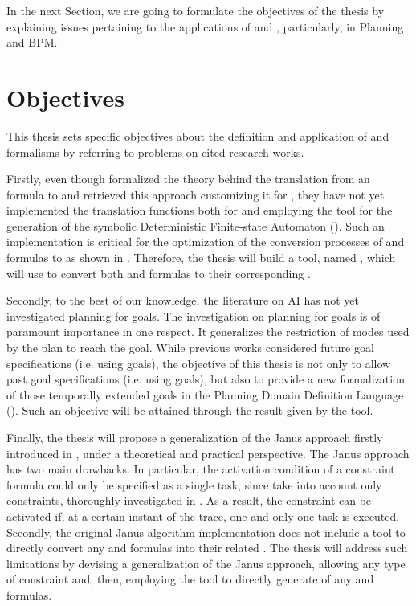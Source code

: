 In the next Section, we are going to formulate the objectives of the thesis by explaining issues pertaining to the applications of \LTLf and \PLTL, particularly, in Planning and BPM.
\section{Objectives}
This thesis sets specific objectives about the definition and application of \LTLf and \PLTL formalisms by referring to problems on cited research works.

Firstly, even though \cite{de2013linear} formalized the theory behind the translation from an \LTLf formula to \FOL and \cite{zpv2018} retrieved this approach customizing it for \MONA, they have not yet implemented the translation functions both for \LTLf and \PLTL employing the \MONA tool for the generation of the symbolic Deterministic Finite-state Automaton (\DFA). Such an implementation is critical for the optimization of the conversion processes of \LTLf and \PLTL formulas to \DFA as shown in \cite{zhu2017symbolic}. Therefore, the thesis will build a tool, named \LTLfToDFA, which will use \MONA to convert both \LTLf and \PLTL formulas to their corresponding \DFA.

Secondly, to the best of our knowledge, the literature on AI has not yet investigated planning for \PLTL goals. The investigation on planning for \PLTL goals is of paramount importance in one respect. It generalizes the restriction of modes used by the plan to reach the goal. While previous works \citep{camacho2017non, camacho2018finite, camacho2018ltl} considered future goal specifications (i.e. using \LTLf goals), the objective of this thesis is not only to allow past goal specifications (i.e. using \PLTL goals), but also to provide a new formalization of those temporally extended goals in the Planning Domain Definition Language (\PDDL). Such an objective will be attained through the result given by the \LTLfToDFA tool.

Finally, the thesis will propose a generalization of the Janus approach firstly introduced in \cite{cecconi2018interestingness}, under a theoretical and practical perspective. The Janus approach has two main drawbacks. In particular, the activation condition of a constraint formula could only be specified as a single task, since \cite{cecconi2018interestingness} take into account only \declare constraints, thoroughly investigated in \cite{pesic2008constraint}. As a result, the constraint can be activated if, at a certain instant of the trace, one and only one task is executed. Secondly, the original Janus algorithm implementation does not include a tool to directly convert any \LTLf and \PLTL formulas into their related \DFAs. The thesis will address such limitations by devising a generalization of the Janus approach, allowing any type of constraint and, then, employing the \LTLfToDFA tool to directly generate \DFA of any \LTLf and \PLTL formulas.
